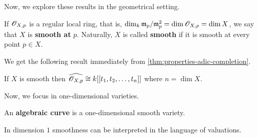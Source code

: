 Now, we explore these results in the geometrical setting. 
\begin{definition}\label{def:}
	If ${\mathscr O}_{X,p}$ is a regular local ring, that is, $\dim_{k} \mathfrak{m}_{p}/\mathfrak{m}_{p}^{2} = \dim {\mathscr O}_{X,p} = \dim X$, we say that $X$ is \textbf{smooth at} $p$. Naturally, $X$ is called \textbf{smooth} if it is smooth at every point $p\in X$.
\end{definition}
We get the following result immediately from \cref{thm:properties-adic-completion}.
\begin{corollary}\label{cor:smooth-iff-isomorphic-to-power-series}
	If $X$ is smooth then $\widehat{{\mathscr O}_{X,p}} \cong k[[t_{1}, t_{2}, \ldots, t_{n}]]$ where $n = \dim X$.
\end{corollary}
Now, we focus in one-dimensional varieties.
\begin{definition}\label{def:algebraic-curve}
	An \textbf{algebraic curve} is a one-dimensional smooth variety.
\end{definition}
In dimension $1$ smoothness can be interpreted in the language of valuations.
